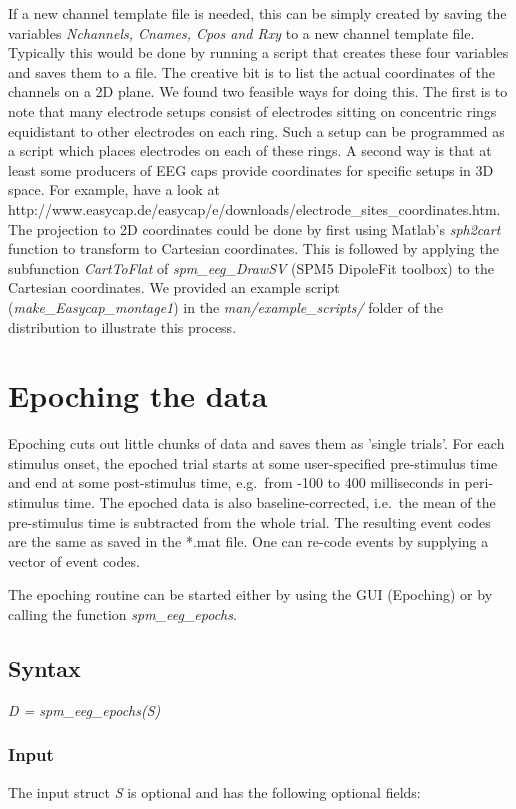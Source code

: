 If a new channel template file is needed, this can be simply created by
saving the variables {\it Nchannels, Cnames, Cpos and Rxy} to a new
channel template file. Typically this would be done by running a
script that creates these four variables and saves them to a file. The
creative bit is to list the actual coordinates of the channels on a
2D plane. We found two feasible ways for doing this. The first is to
note that many electrode setups consist of electrodes sitting on
concentric rings equidistant to other electrodes on each ring. Such a 
setup can be programmed as a script which places electrodes on each of
these rings. A second way is that at least some producers of EEG caps
provide coordinates for specific setups in 3D space. For example,
have a look at
http://www.easycap.de/easycap/e/downloads/electrode\_sites\_coordinates.htm.
The projection to 2D coordinates could be done by first using Matlab's
{\it sph2cart} function to transform to Cartesian coordinates. This is
followed by applying the subfunction {\it CartToFlat} of {\it
  spm\_eeg\_DrawSV} (SPM5 DipoleFit toolbox) to the Cartesian coordinates.
We provided an example script (\textit{make\_Easycap\_montage1}) in the
\textit{man/example\_scripts/} folder of the distribution to illustrate
this process.

\section{Epoching the data}
Epoching cuts out little chunks of data and saves them as 'single
trials'. For each stimulus onset, the epoched trial starts at some
user-specified pre-stimulus time and end at some post-stimulus time,
e.g.~from -100 to 400 milliseconds in peri-stimulus
time. The epoched data is also baseline-corrected, i.e.~the mean of
the pre-stimulus time is subtracted from the whole trial. The
resulting event codes are the same as saved in the *.mat file. One can
re-code events by supplying a vector of event codes.

The epoching routine can be started either by using the GUI
(Epoching) or by calling the function \textit{spm\_eeg\_epochs}.

\subsection{Syntax}
\textit{D = spm\_eeg\_epochs(S)}
\\

\subsubsection{Input}
The input struct {\it S} is optional and has the following optional fields:

